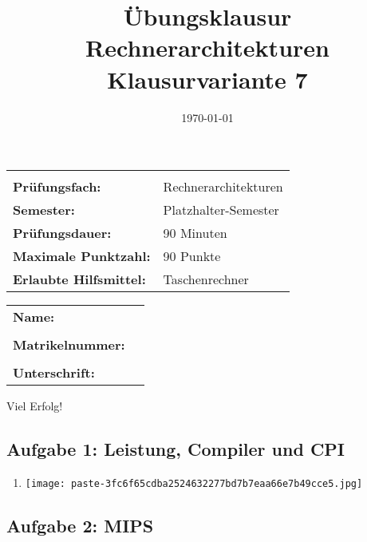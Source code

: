\documentclass[12pt,a4paper]{article}
\title{Übungsklausur Rechnerarchitekturen \\ \large Klausurvariante 7}
\author{}
\date{\today}
\begin{document}
\begin{titlepage}
    \maketitle
    \vspace{0.5cm}
    \centering
    \begin{tabularx}{0.9\textwidth}{lX}
        \hline\hline \\
        \textbf{Prüfungsfach:} & Rechnerarchitekturen \\
        \textbf{Semester:} & Platzhalter-Semester \\
        \textbf{Prüfungsdauer:} & 90 Minuten \\
        \textbf{Maximale Punktzahl:} & 90 Punkte \\
        \textbf{Erlaubte Hilfsmittel:} & Taschenrechner \\
        \hline\hline
    \end{tabularx}
    \vspace{2.5cm}
    \begin{tabularx}{0.9\textwidth}{lX}
        \textbf{Name:} & \dotfill \\
        \\
        \textbf{Matrikelnummer:} & \dotfill \\
        \\
        \textbf{Unterschrift:} & \dotfill \\
    \end{tabularx}
    \vfill
    {\Large Viel Erfolg!}
\end{titlepage}
\clearpage
\subsection*{Aufgabe 1: Leistung, Compiler und CPI}

\begin{enumerate}[label=\alph*), topsep=5pt, itemsep=10pt]
\item \mbox{}\begin{center}\texttt{[image: paste-3fc6f65cdba2524632277bd7b7eaa66e7b49cce5.jpg]}
\end{center}
\end{enumerate}
\clearpage
\subsection*{Aufgabe 2: MIPS}
\end{document}
